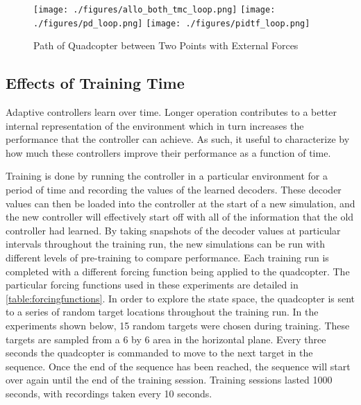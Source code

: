 \documentclass[letterpaper,12pt,titlepage,oneside,final]{book}
\begin{document}
\begin{figure}
\centering
\texttt{[image: ./figures/allo\_both\_tmc\_loop.png]}
\texttt{[image: ./figures/pd\_loop.png]}
\texttt{[image: ./figures/pidtf\_loop.png]}
\caption{Path of Quadcopter between Two Points with External Forces} %
\label{fig:loop_path}
\end{figure}


\subsection{Effects of Training Time}

Adaptive controllers learn over time.
Longer operation contributes to a better internal representation of the environment which in turn increases the performance that the controller can achieve.
As such, it useful to characterize by how much these controllers improve their performance as a function of time.

Training is done by running the controller in a particular environment for a period of time and recording the values of the learned decoders. %
These decoder values can then be loaded into the controller at the start of a new simulation, and the new controller will effectively start off with all of the information that the old controller had learned.
By taking snapshots of the decoder values at particular intervals throughout the training run, the new simulations can be run with different levels of pre-training to compare performance.
Each training run is completed with a different forcing function being applied to the quadcopter.
The particular forcing functions used in these experiments are detailed in \autoref{table:forcingfunctions}.
In order to explore the state space, the quadcopter is sent to a series of random target locations throughout the training run.
In the experiments shown below, 15 random targets were chosen during training.
These targets are sampled from a 6 by 6 area in the horizontal plane.
Every three seconds the quadcopter is commanded to move to the next target in the sequence. Once the end of the sequence has been reached, the sequence will start over again until the end of the training session. %
Training sessions lasted 1000 seconds, with recordings taken every 10 seconds. %
\end{document}
